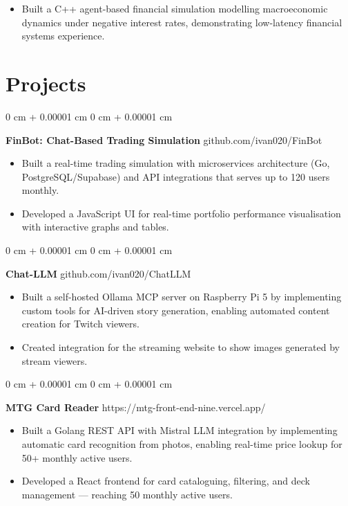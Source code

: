 \documentclass[6pt, letterpaper]{article}
\newenvironment{highlights}{
    \begin{itemize}[
        topsep=0.03 cm,
        parsep=0.03 cm,
        partopsep=0pt,
        itemsep=0pt,
        leftmargin=0 cm + 10pt
    ]
}{
    \end{itemize}
} %
\newenvironment{onecolentry}{
    \begin{adjustwidth}{
        0 cm + 0.00001 cm
    }{
        0 cm + 0.00001 cm
    }
}{
    \end{adjustwidth}
} %
\begin{document}
            \begin{highlights}
            \item Built a C++ agent-based financial simulation modelling macroeconomic dynamics under negative interest rates, demonstrating low-latency financial systems experience.
            \end{highlights}

    \section{Projects}

    \begin{onecolentry}
        \textbf{FinBot: Chat-Based Trading Simulation} \hfill github.com/ivan020/FinBot

        \begin{highlights}
            \item Built a real-time trading simulation with microservices architecture (Go, PostgreSQL/Supabase) and API integrations that serves up to 120 users monthly.
            \item Developed a JavaScript UI for real-time portfolio performance visualisation with interactive graphs and tables.       
        \end{highlights}
    \end{onecolentry}

    \begin{onecolentry}
        \textbf{Chat-LLM} \hfill github.com/ivan020/ChatLLM

        \begin{highlights}
            \item Built a self-hosted Ollama MCP server on Raspberry Pi 5 by implementing custom tools for AI-driven story generation, enabling automated content creation for Twitch viewers.
            \item Created integration for the streaming website to show images generated by stream viewers.
        \end{highlights}
    \end{onecolentry}


    \begin{onecolentry}
        \textbf{MTG Card Reader} \hfill https://mtg-front-end-nine.vercel.app/

        \begin{highlights}
        \item Built a Golang REST API with Mistral LLM integration by implementing automatic card recognition from photos, enabling real-time price lookup for 50+ monthly active users.
        \item Developed a React frontend for card cataloguing, filtering, and deck management — reaching 50 monthly active users.        \end{highlights}
    \end{onecolentry}
\end{document}
